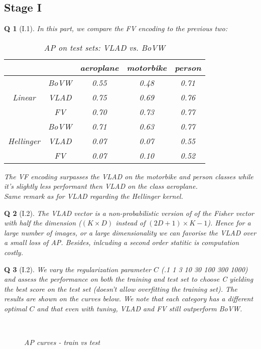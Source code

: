 \documentclass[11pt]{article}
\theoremstyle{exo}
\newtheorem*{exercise}{Q}
\newcommand{\1}{\mathbf{1}}
\newcommand{\0}{\mathbf{0}}
\begin{document}
\subsection*{Stage I}
\begin{exercise}[I.1]
	In this part, we compare the FV encoding to the previous two:
		\begin{table}[H]
			\centering
			\caption{AP on test sets: VLAD vs. BoVW}
			\begin{tabular}{|c|c|c|c|c|}
			\cline{3-5}
			\multicolumn{2}{c|}{} & aeroplane & motorbike & person\\
			\hline
			\multirow{3}{*}{Linear} & BoVW & 0.55 & 0.48 & 0.71\\
			\cline{2-5}
			&VLAD & 0.75 & 0.69 & 0.76\\
			\cline{2-5}
			&FV & 0.70 & 0.73 & 0.77\\
			\hline
			\hline
			\multirow{3}{*}{Hellinger} & BoVW & 0.71 & 0.63 & 0.77\\
			\cline{2-5}
			&VLAD & 0.07 & 0.07 &0.55\\
			\cline{2-5}
			&FV & 0.07 & 0.10 & 0.52\\
			\hline
			\end{tabular}
		\end{table}
	 The VF encoding surpasses the VLAD on the \textit{motorbike} and \textit{person} classes while it's slightly less performant then VLAD on the class \textit{aeroplane}.\\
	 Same remark as for VLAD regarding the Hellinger kernel.
\end{exercise}


\begin{exercise}[I.2]
The VLAD vector is a non-probabilistic version of of the Fisher vector with half the dimension ($(K\times D)$ instead of $(2D + 1)\times K − 1$). Hence for a large number of images, or a large dimensionality we can favorise the VLAD over a small loss of AP. Besides, inlcuding a second order statitic is computation costly.
\end{exercise}

\begin{exercise}[I.2]
	We vary the regularization parameter $C$ (.1 1 3 10 30 100 300 1000) and assess the performance on both the training and test set to choose C yielding the best score on the test set (doesn't allow overfitting the training set). The results are shown on the curves below. We note that each category has a different optimal $C$ and that even with tuning, VLAD and FV still outperform BoVW.
	
	\begin{figure}[H]
		\centering
		\caption{AP curves - train vs test}
		\\
		
		\end{figure}
	\end{exercise}
\end{document}
